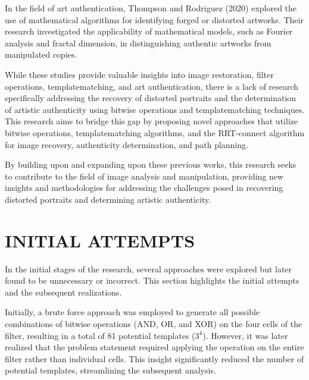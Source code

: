\documentclass[letterpaper, 10 pt, conference]{IEEEtran}
\begin{document}
In the field of art authentication, Thompson and Rodriguez (2020) 
explored the use of mathematical algorithms for identifying forged 
or distorted artworks. Their research investigated the applicability of 
mathematical models, such as Fourier analysis and fractal dimension, 
in distinguishing authentic artworks from manipulated copies.

While these studies provide valuable insights into image restoration, 
filter operations, templatematching, and art authentication, there is a 
lack of research specifically addressing the recovery of distorted portraits 
and the determination of artistic authenticity using bitwise operations and 
templatematching techniques. This research aims to bridge this gap by 
proposing novel approaches that utilize bitwise operations, templatematching 
algorithms, and the RRT-connect algorithm for image recovery, 
authenticity determination, and path planning.

By building upon and expanding upon these previous works, this research seeks
to contribute to the field of image analysis and manipulation, providing new
insights and methodologies for addressing the challenges posed in recovering
distorted portraits and determining artistic authenticity.

\section{INITIAL ATTEMPTS}



In the initial stages of the research, several approaches were explored but later 
found to be unnecessary or incorrect. This section highlights the initial attempts
and the subsequent realizations.

Initially, a brute force approach was employed to generate all possible combinations
of bitwise operations (AND, OR, and XOR) on the four cells of the filter, resulting
in a total of 81 potential templates ($3^4$). However, it was later realized that the 
problem statement required applying the operation on the entire filter rather than
individual cells. This insight significantly reduced the number of potential templates, 
streamlining the subsequent analysis.
\end{document}
